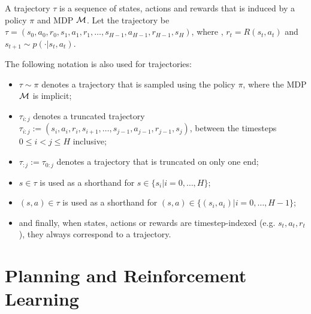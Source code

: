     \begin{defn}
        \label{def:2:trajectory}
        A \textnormal{trajectory} $\tau$ is a sequence of states, actions and rewards that is induced by a policy $\pi$ and MDP $\mathcal{M}$. Let the trajectory be $\tau = (s_0, a_0, r_0, s_1, a_1, r_1, \ldots, \allowbreak s_{H-1}, a_{H-1}, r_{H-1}, s_H)$, where , $r_t=R(s_t,a_t)$ and $s_{t+1} \sim p(\cdot|s_t,a_t)$.
        
        The following notation is also used for trajectories:
        \begin{itemize}
            \item $\tau\sim\pi$ denotes a trajectory that is sampled using the policy $\pi$, where the MDP $\mathcal{M}$ is implicit;
            \item $\tau_{i:j}$ denotes a \textnormal{truncated trajectory} $\tau_{i:j}:=(s_i, a_i, r_i, s_{i+1}, \ldots, s_{j-1}, a_{j-1}, r_{j-1}, s_j)$, between the timesteps $0\leq i < j \leq H$ inclusive; %
            \item $\tau_{:j}:=\tau_{0:j}$ denotes a trajectory that is truncated on only one end;
            \item $s\in \tau$ is used as a shorthand for $s\in\{s_i|i=0,\ldots,H\}$;
            \item $(s,a)\in\tau$ is used as a shorthand for $(s,a)\in\{(s_i,a_i)|i=0,\ldots,H-1\}$;
            \item and finally, when states, actions or rewards are timestep-indexed (e.g. $s_t,a_t,r_t$), they always correspond to a trajectory.
        \end{itemize}
    \end{defn}








    



\section{Planning and Reinforcement Learning}
\label{sec:2-3-rl}

